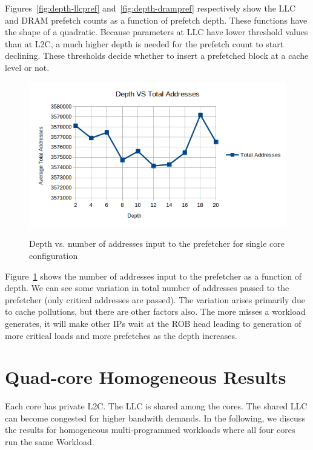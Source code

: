 Figures~\ref{fig:depth-llcpref} and~\ref{fig:depth-drampref} respectively show the LLC and DRAM prefetch counts as a function of prefetch depth. These functions have the shape of a quadratic.
Because parameters at LLC have lower threshold values than at L2C, a much higher depth is needed for the prefetch count to start declining.
These thresholds decide whether to insert a prefetched block at a cache level or not.
\begin{figure}[H]
{\includegraphics[scale=0.7]{images/Depth vs Critical Addresses.png}}
\caption{Depth vs. number of addresses input to the prefetcher for single core configuration}
\label{fig:depth-address}
\end{figure}

Figure~\ref{fig:depth-address} shows the number of addresses input to the prefetcher as a function of depth.
We can see some variation in total number of addresses passed to the prefetcher (only critical addresses are passed). The variation arises primarily due to cache  pollutions, but there are other factors also. The more misses a workload generates, it will make other IPs wait at the ROB head leading to generation of more critical loads and more prefetches as the depth increases.

\section{Quad-core Homogeneous Results}

Each core has private L2C. The LLC is shared among the cores. The shared LLC can become congested for higher bandwith demands. In the following, we discuss the results for homogeneous multi-programmed workloads where all four cores run the same Workload.

